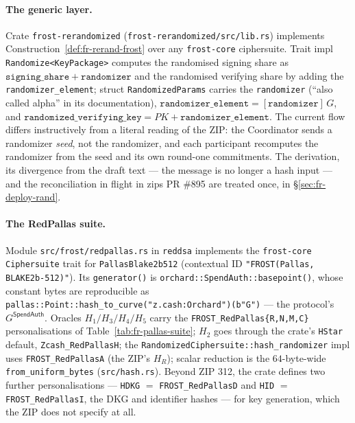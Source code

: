 \documentclass[11pt,a4paper]{article}
\theoremstyle{definition}
\begin{document}
\paragraph{The generic layer.} Crate \texttt{frost-rerandomized}
(\texttt{frost-rerandomized/src/lib.rs}) implements
Construction~\ref{def:fr-rerand-frost} over any \texttt{frost-core}
ciphersuite. Trait impl \texttt{Randomize<KeyPackage>} computes the
randomised signing share as $\mathtt{signing\_share} + \mathtt{randomizer}$
and the randomised verifying share by adding the
\texttt{randomizer\_element}; struct \texttt{RandomizedParams} carries
the \texttt{randomizer} (``also called alpha'' in its documentation),
$\mathtt{randomizer\_element} = [\mathtt{randomizer}]\,G$, and
$\mathtt{randomized\_verifying\_key} = PK + \mathtt{randomizer\_element}$.
The current flow differs instructively from a literal reading of the
ZIP: the Coordinator sends a randomizer \emph{seed}, not the
randomizer, and each participant recomputes the randomizer from the
seed and its own round-one commitments. The derivation, its divergence
from the draft text --- the message is no longer a hash input --- and
the reconciliation in flight in zips PR \#895 are treated once, in
\S\ref{sec:fr-deploy-rand}.

\paragraph{The RedPallas suite.} Module \texttt{src/frost/redpallas.rs}
in \texttt{reddsa} implements the \texttt{frost-core}
\texttt{Ciphersuite} trait for \texttt{PallasBlake2b512} (contextual ID
\texttt{"FROST(Pallas, BLAKE2b-512)"}). Its \texttt{generator()} is
\texttt{orchard::SpendAuth::basepoint()}, whose constant bytes are
reproducible as
\texttt{pallas::Point::hash\_to\_curve("z.cash:Orchard")(b"G")} --- the
protocol's $G^{\mathsf{SpendAuth}}$. Oracles $H_1/H_3/H_4/H_5$ carry the
\texttt{FROST\_RedPallas\{R,N,M,C\}} personalisations of
Table~\ref{tab:fr-pallas-suite}; $H_2$ goes through the crate's
\texttt{HStar} default, \texttt{Zcash\_RedPallasH}; the
\texttt{RandomizedCiphersuite::hash\_randomizer} impl uses
\texttt{FROST\_RedPallasA} (the ZIP's $H_R$); scalar reduction is the
$64$-byte-wide \texttt{from\_uniform\_bytes} (\texttt{src/hash.rs}).
Beyond ZIP 312, the crate defines two further personalisations ---
\texttt{HDKG} $=$ \texttt{FROST\_RedPallasD} and \texttt{HID} $=$
\texttt{FROST\_RedPallasI}, the DKG and identifier hashes --- for key
generation, which the ZIP does not specify at all.
\end{document}
